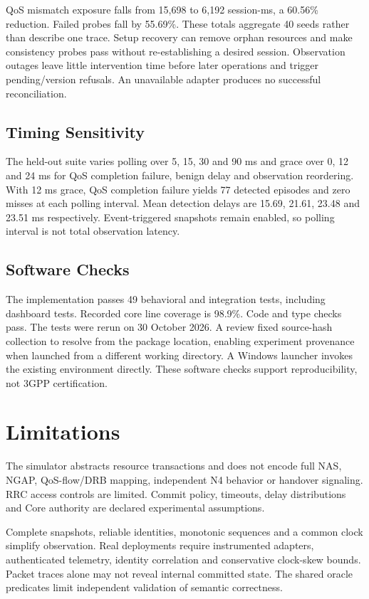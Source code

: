 \documentclass[conference]{IEEEtran}
\begin{document}
QoS mismatch exposure falls from 15,698 to 6,192 session-ms, a 60.56\% reduction. Failed probes fall by 55.69\%. These totals aggregate 40 seeds rather than describe one trace. Setup recovery can remove orphan resources and make consistency probes pass without re-establishing a desired session. Observation outages leave little intervention time before later operations and trigger pending/version refusals. An unavailable adapter produces no successful reconciliation.

\subsection{Timing Sensitivity}
The held-out suite varies polling over 5, 15, 30 and 90 ms and grace over 0, 12 and 24 ms for QoS completion failure, benign delay and observation reordering. With 12 ms grace, QoS completion failure yields 77 detected episodes and zero misses at each polling interval. Mean detection delays are 15.69, 21.61, 23.48 and 23.51 ms respectively. Event-triggered snapshots remain enabled, so polling interval is not total observation latency.

\subsection{Software Checks}
The implementation passes 49 behavioral and integration tests, including dashboard tests. Recorded core line coverage is 98.9\%. Code and type checks pass. The tests were rerun on 30 October 2026. A review fixed source-hash collection to resolve from the package location, enabling experiment provenance when launched from a different working directory. A Windows launcher invokes the existing environment directly. These software checks support reproducibility, not 3GPP certification.

\section{Limitations}
The simulator abstracts resource transactions and does not encode full NAS, NGAP, QoS-flow/DRB mapping, independent N4 behavior or handover signaling. RRC access controls are limited. Commit policy, timeouts, delay distributions and Core authority are declared experimental assumptions.

Complete snapshots, reliable identities, monotonic sequences and a common clock simplify observation. Real deployments require instrumented adapters, authenticated telemetry, identity correlation and conservative clock-skew bounds. Packet traces alone may not reveal internal committed state. The shared oracle predicates limit independent validation of semantic correctness.
\end{document}
